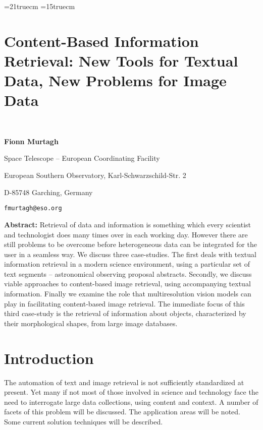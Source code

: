 \textheight=21truecm 
\textwidth=15truecm  


\section*{Content-Based Information Retrieval: New Tools for Textual 
Data, New Problems for Image Data}

\bigskip
 
\

{\bf Fionn Murtagh}
 
Space Telescope -- European Coordinating Facility
 
European Southern Observatory, Karl-Schwarzschild-Str. 2
 
D-85748 Garching, Germany
 
{\tt fmurtagh@eso.org}
 
\bigskip
 
\bigskip
 


{\bf Abstract:}
Retrieval of data and 
information is something which every scientist and technologist
does many times over in each working day.  However there are still problems 
to be overcome before heterogeneous data can be integrated for the 
user in a seamless way.  We discuss three case-studies.  The first deals with
textual information retrieval
in a modern science environment, using a particular set of text segments
-- astronomical observing proposal abstracts.
Secondly, we discuss viable approaches to content-based image retrieval, using
accompanying textual information.
Finally we examine the role that multiresolution vision models can play in 
facilitating content-based image retrieval.  The immediate focus of this
third case-study is the
retrieval of information about objects, characterized by their morphological
shapes, from large image databases.



\section{Introduction}

The automation of text and image retrieval is not sufficiently 
standardized at present.  Yet many if not most of those involved in 
science and technology face the need to interrogate large data collections,
using content and context.  A number of facets of this problem will be 
discussed.  The application areas will be noted.  Some current solution 
techniques will be described.  

